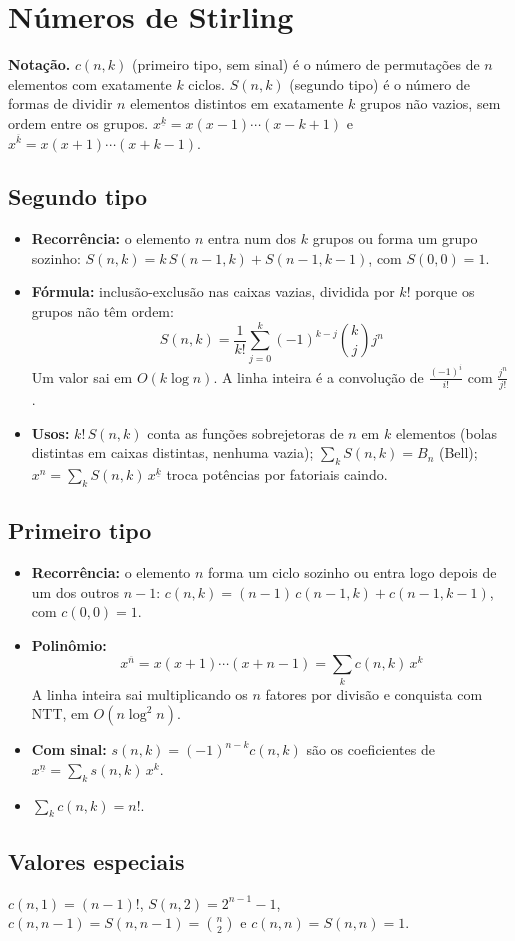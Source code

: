 \section{Números de Stirling}

\textbf{Notação.} $c(n, k)$ (primeiro tipo, sem sinal) é o número de permutações de $n$ elementos com exatamente $k$
ciclos. $S(n, k)$ (segundo tipo) é o número de formas de dividir $n$ elementos distintos em exatamente $k$ grupos não
vazios, sem ordem entre os grupos. $x^{\underline{k}} = x(x-1)\cdots(x-k+1)$ e $x^{\overline{k}} = x(x+1)\cdots(x+k-1)$.

\subsection*{Segundo tipo}

\begin{itemize}
  \item \textbf{Recorrência:} o elemento $n$ entra num dos $k$ grupos ou forma um grupo sozinho:
        $S(n, k) = k\,S(n - 1, k) + S(n - 1, k - 1)$, com $S(0, 0) = 1$.
  \item \textbf{Fórmula:} inclusão-exclusão nas caixas vazias, dividida por $k!$ porque os grupos não têm ordem:
        \[
        \boxed{S(n, k) = \frac{1}{k!} \sum_{j=0}^{k} (-1)^{k-j} \binom{k}{j} j^n}
        \]
        Um valor sai em $O(k \log n)$. A linha inteira é a convolução de $\frac{(-1)^i}{i!}$ com $\frac{j^n}{j!}$.
  \item \textbf{Usos:} $k!\,S(n, k)$ conta as funções sobrejetoras de $n$ em $k$ elementos (bolas distintas em caixas
        distintas, nenhuma vazia); $\sum_k S(n, k) = B_n$ (Bell); $x^n = \sum_k S(n, k)\, x^{\underline{k}}$ troca
        potências por fatoriais caindo.
\end{itemize}

\subsection*{Primeiro tipo}

\begin{itemize}
  \item \textbf{Recorrência:} o elemento $n$ forma um ciclo sozinho ou entra logo depois de um dos outros $n - 1$:
        $c(n, k) = (n - 1)\,c(n - 1, k) + c(n - 1, k - 1)$, com $c(0, 0) = 1$.
  \item \textbf{Polinômio:}
        \[
        \boxed{x^{\overline{n}} = x(x + 1) \cdots (x + n - 1) = \sum_k c(n, k)\, x^k}
        \]
        A linha inteira sai multiplicando os $n$ fatores por divisão e conquista com NTT, em $O(n \log^2 n)$.
  \item \textbf{Com sinal:} $s(n, k) = (-1)^{n-k} c(n, k)$ são os coeficientes de $x^{\underline{n}} = \sum_k s(n, k)\, x^k$.
  \item $\sum_k c(n, k) = n!$.
\end{itemize}

\subsection*{Valores especiais}

$c(n, 1) = (n - 1)!$, $S(n, 2) = 2^{n-1} - 1$, $c(n, n - 1) = S(n, n - 1) = \binom{n}{2}$ e $c(n, n) = S(n, n) = 1$.
